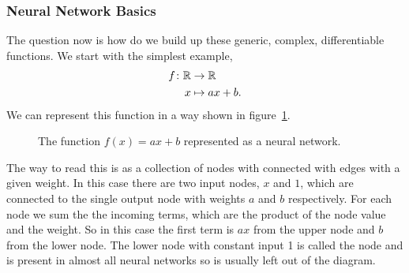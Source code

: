 \documentclass[a4paper]{article}
\begin{document}
    \subsubsection{Neural Network Basics}
    The question now is how do we build up these generic, complex, differentiable functions.
    We start with the simplest example,
    \begin{align*}
        f\colon\mathbb{R}&\to\mathbb{R}\\
        x&\mapsto ax + b.
    \end{align*}
    We can represent this function in a way shown in figure~\ref{fig:ax + b neural network}.
    \begin{figure}[ht]
        \centering
        \caption{The function \(f(x) = ax + b\) represented as a neural network.}
        \label{fig:ax + b neural network}
    \end{figure}
    The way to read this is as a collection of nodes with connected with edges with a given weight.
    In this case there are two input nodes, \(x\) and \(1\), which are connected to the single output node with weights \(a\) and \(b\) respectively.
    For each node we sum the the incoming terms, which are the product of the node value and the weight.
    So in this case the first term is \(ax\) from the upper node and \(b\) from the lower node.
    The lower node with constant input 1 is called the  node and is present in almost all neural networks so is usually left out of the diagram.
    
\end{document}
